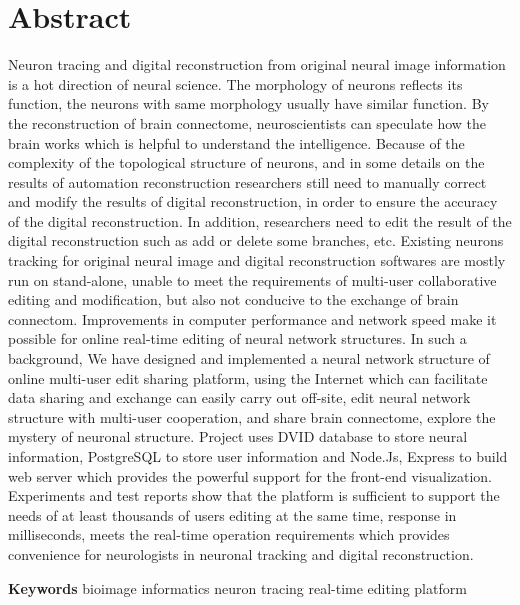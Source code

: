 \chapter{Abstract}

Neuron tracing and digital reconstruction from original neural image information is a hot direction of neural science. The morphology of neurons reflects its function, the neurons with same morphology usually have similar function. By the reconstruction of brain connectome, neuroscientists can speculate how the brain works which is helpful to understand the intelligence. Because of the complexity of the topological structure of neurons, and in some details on the results of automation reconstruction researchers still need to manually correct and modify the results of digital reconstruction, in order to ensure the accuracy of the digital reconstruction. In addition, researchers need to edit the result of the digital reconstruction such as add or delete some branches, etc. Existing neurons tracking for original neural image and digital reconstruction softwares are mostly run on stand-alone, unable to meet the requirements of multi-user collaborative editing and modification, but also not conducive to the exchange of brain connectom. Improvements in computer performance and network speed make it possible for online real-time editing of neural network structures. In such a background, We have designed and implemented a neural network structure of online multi-user edit sharing platform, using the Internet which can facilitate data sharing and exchange can easily carry out off-site, edit neural network structure with multi-user cooperation, and share brain connectome, explore the mystery of neuronal structure. Project uses DVID database to store neural information, PostgreSQL to store user information and Node.Js, Express to build web server which provides the powerful support for the front-end visualization. 
Experiments and test reports show that the platform is sufficient to support the needs of at least thousands of users editing at the same time, response in milliseconds, meets the real-time operation requirements which provides convenience for neurologists in neuronal tracking and digital reconstruction.

{
    \vspace{1em}
    \setlength{\parindent}{0em}
    \textbf{Keywords} \; bioimage informatics \;  neuron tracing \; real-time editing platform \par
}
